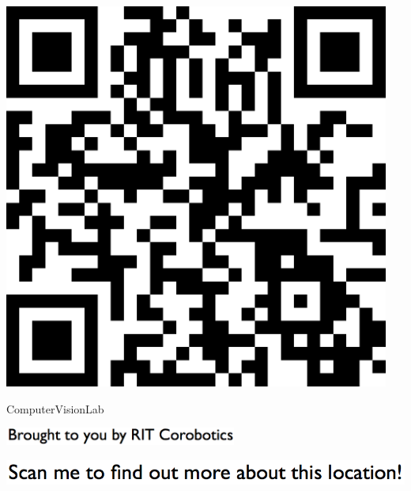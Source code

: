 \documentclass[letterpaper]{article}
\begin{document}
 \begingroup 
 \centerline{\includegraphics[scale=1,width=5in,height=5in]{ComputerVisionLab.png}} 
 \endgroup 
 \vspace*{\fill} 

 \hfill{\small ComputerVisionLab} 

  \vspace{0.7in} 
 
 \centerline{\includegraphics[scale=1,width=3in]{text-bottom.png}} 
 
 \pagebreak 
{} 
 \vspace*{\fill} 
 
  \centerline{\includegraphics[scale=1,width=6in]{text-top.png}} 
 
 \vspace{0.5in} 
 
\end{document}
